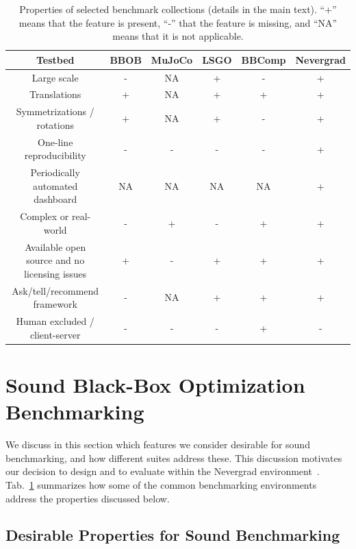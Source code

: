 \begin{table}[ht]
\centering
	\caption{\label{overview} Properties of selected benchmark collections (details in the main text). ``+'' means that the feature is present, ``-'' that the feature is missing, and ``NA'' means that it is not applicable.}
\scriptsize
\begin{tabular}{|c|c|c|c|c|c|}
	\hline
		Testbed & BBOB & MuJoCo& LSGO & BBComp& Nevergrad \\
	\hline
	\hline
		Large scale     & - & NA & + & -  & + \\
		Translations    & + & NA& +  & + & + \\
		Symmetrizations / rotations & + & NA& +  &  -& + \\
		One-line reproducibility& - & - & -  & -& + \\
		Periodically automated dashboard & NA & NA& NA & NA & + \\
		Complex or real-world & - & + & -  & +& + \\
		Available open source and no licensing issues & +  & - &  + &  + & + \\
		Ask/tell/recommend framework & - & NA& +  & + & + \\
		Human excluded / client-server & -& -& -& + &- \\
	\hline
\end{tabular}
\end{table}


\section{Sound Black-Box Optimization Benchmarking}\label{bench}

{We discuss in this section which features we consider desirable for sound benchmarking, and how different suites address these. This discussion motivates our decision to design and to evaluate \ngoptq{} within the Nevergrad environment~\cite{nevergrad}. Tab.~\ref{overview} summarizes how some of the common benchmarking environments address the properties discussed below.}

{\subsection{Desirable Properties for Sound Benchmarking}} %

